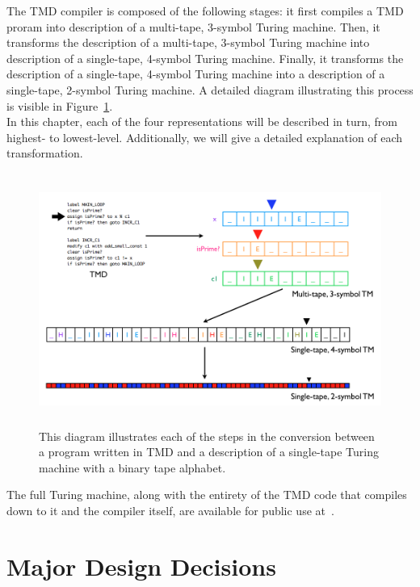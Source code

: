 The TMD compiler is composed of the following stages: it first compiles a TMD proram into description of a multi-tape, 3-symbol Turing machine. Then, it transforms the description of a multi-tape, 3-symbol Turing machine into description of a single-tape, 4-symbol Turing machine. Finally, it transforms the description of a single-tape, 4-symbol Turing machine into a description of a single-tape, 2-symbol Turing machine. A detailed diagram illustrating this process is visible in Figure~\ref{fig:process}. \\

In this chapter, each of the four representations will be described in turn, from highest- to lowest-level. Additionally, we will give a detailed explanation of each transformation. \\

\begin{figure} 
\begin{center} 
\includegraphics[height=3.25in,width=5in,angle=0]{figs/process.png} 
\caption{This diagram illustrates each of the steps in the conversion between a program written in TMD and a description of a single-tape Turing machine with a binary tape alphabet.\label{fig:process}} 
\end{center} 
\end{figure}  


The full Turing machine, along with the entirety of the TMD code that compiles down to it and the compiler itself, are available for public use at~\cite{github}.

\section{Major Design Decisions}

